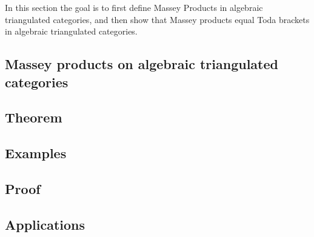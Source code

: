 In this section the goal is to first define Massey Products in algebraic triangulated categories, and then show that Massey products equal Toda brackets in algebraic triangulated categories.

\subsection{Massey products on algebraic triangulated categories}


\subsection{Theorem}


\subsection{Examples}


\subsection{Proof}


\subsection{Applications}
